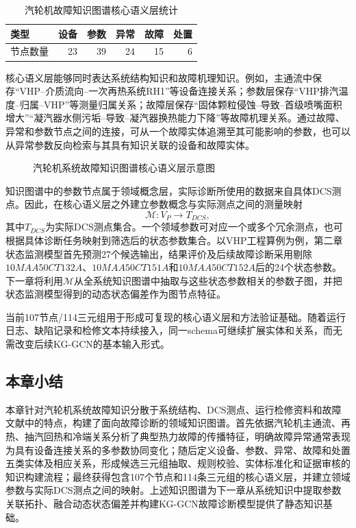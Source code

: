 \begin{table}[htbp]
    \centering
    \caption{汽轮机故障知识图谱核心语义层统计}
    \label{tab:kg_stats_v3}
    \begin{tabular}{lrrrrr}
        \toprule
        类型 & 设备 & 参数 & 异常 & 故障 & 处置 \\
        \midrule
        节点数量 & 23 & 39 & 24 & 15 & 6 \\
        \bottomrule
    \end{tabular}
\end{table}

核心语义层能够同时表达系统结构知识和故障机理知识。例如，主通流中保存“VHP--介质流向--一次再热系统RH1”等设备连接关系；参数层保存“VHP排汽温度--归属--VHP”等测量归属关系；故障层保存“固体颗粒侵蚀--导致--首级喷嘴面积增大”“凝汽器水侧污垢--导致--凝汽器换热能力下降”等故障机理关系。通过故障、异常和参数节点之间的连接，可从一个故障实体追溯至其可能影响的参数，也可以从异常参数反向检索与其具有知识关联的设备和故障实体。

\begin{figure}[htbp]
    \centering
    \caption{汽轮机系统故障知识图谱核心语义层示意图}
    \label{fig:kg_core_graph_v3}
\end{figure}

知识图谱中的参数节点属于领域概念层，实际诊断所使用的数据来自具体DCS测点。因此，在核心语义层之外建立参数概念与实际测点之间的测量映射
\begin{equation}
    \mathcal M:V_P\rightarrow T_{DCS},
\end{equation}
其中$T_{DCS}$为实际DCS测点集合。一个领域参数可对应一个或多个冗余测点，也可根据具体诊断任务映射到筛选后的状态参数集合。以VHP工程算例为例，第二章状态监测模型首先预测27个候选输出，结果评价及后续故障诊断采用剔除$10MAA50CT132A$、$10MAA50CT151A$和$10MAA50CT152A$后的24个状态参数。下一章将利用$\mathcal M$从全系统知识图谱中抽取与这些状态参数相关的参数子图，并把状态监测模型得到的动态状态偏差作为图节点特征。

当前107节点/114三元组用于形成可复现的核心语义层和方法验证基础。随着运行日志、缺陷记录和检修文本持续接入，同一schema可继续扩展实体和关系，而无需改变后续KG-GCN的基本输入形式。

\subsection{本章小结}

本章针对汽轮机系统故障知识分散于系统结构、DCS测点、运行检修资料和故障文献中的特点，构建了面向故障诊断的领域知识图谱。首先依据汽轮机主通流、再热、抽汽回热和冷端关系分析了典型热力故障的传播特征，明确故障异常通常表现为具有设备连接关系的多参数协同变化；随后定义设备、参数、异常、故障和处置五类实体及相应关系，形成候选三元组抽取、规则校验、实体标准化和证据审核的知识构建流程；最终获得包含107个节点和114条三元组的核心语义层，并建立领域参数与实际DCS测点之间的映射。上述知识图谱为下一章从系统知识中提取参数关联拓扑、融合动态状态偏差并构建KG-GCN故障诊断模型提供了静态知识基础。

